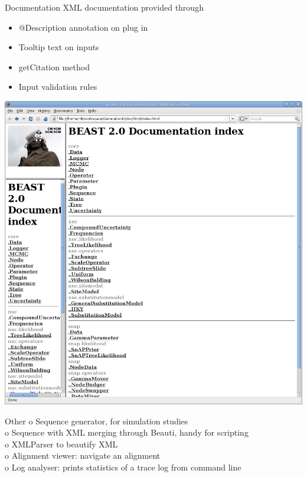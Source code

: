 \documentclass{beamer}
\theoremstyle{definition}
\begin{document}
\begin{frame}{Documentation}
XML documentation provided through

\begin{itemize}
\item @Description annotation on plug in
\item Tooltip text on inputs
\item getCitation method
\item Input validation rules
\end{itemize}

\includegraphics[width=\textwidth]{beastdoc0.png}

\end{frame}


\begin{frame}{Other}
o Sequence generator, for simulation studies\\\vskip0.5cm
o Sequence with XML merging through Beauti, handy for scripting\\\vskip0.5cm
o XMLParser to beautify XML\\\vskip0.5cm
o Alignment viewer: navigate an alignment\\\vskip0.5cm
o Log analyser: prints statistics of a trace log from command line \\\vskip0.5cm
\end{frame}
\end{document}
